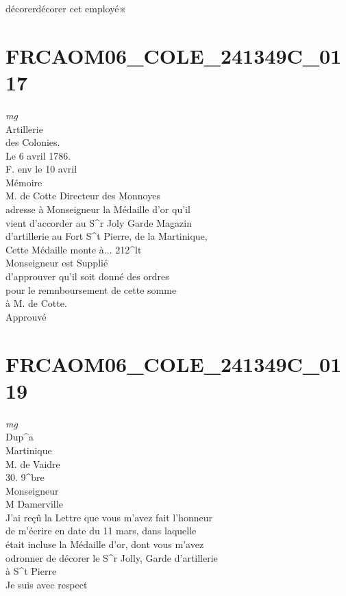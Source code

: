 \documentclass{article}
\begin{document}
\begin{pages}
décorerdécorer cet employé※
\pend
\endnumbering\beginnumbering\section{FRCAOM06\_COLE\_241349C\_0117}
\vspace{0.5cm}\noindent
\textit{mg}
\footnotesize \\
Artillerie\\
des Colonies.\\
Le 6 avril 1786.\\
F. env le 10 avril
\normalsize \pstart
\\
Mémoire\\
M. de Cotte Directeur des Monnoyes\\
adresse à Monseigneur la Médaille d'or qu'il\\
vient d'accorder au S\^{}r Joly Garde Magazin\\
d'artillerie au Fort S\^{}t Pierre, de la Martinique,\\
Cette Médaille monte à... 212\^{}lt\\
Monseigneur est Supplié\\
d'approuver qu'il soit donné des ordres\\
pour le remnboursement de cette somme\\
à M. de Cotte.\\
Approuvé
\pend
\endnumbering\beginnumbering\section{FRCAOM06\_COLE\_241349C\_0119}
\vspace{0.5cm}\noindent
\textit{mg}
\footnotesize \\
Dup\^{}a\\
Martinique\\
M. de Vaidre\\
30. 9\^{}bre
\normalsize \pstart
\\
Monseigneur\\
M Damerville\\
J'ai reçû la Lettre que vous m'avez fait l'honneur\\
de m'écrire en date du 11 mars, dans laquelle\\
était incluse la Médaille d'or, dont vous m'avez\\
odronner de décorer le S\^{}r Jolly, Garde d'artillerie\\
à S\^{}t Pierre\\
Je suis avec respect\\

\end{pages}
\end{document}

